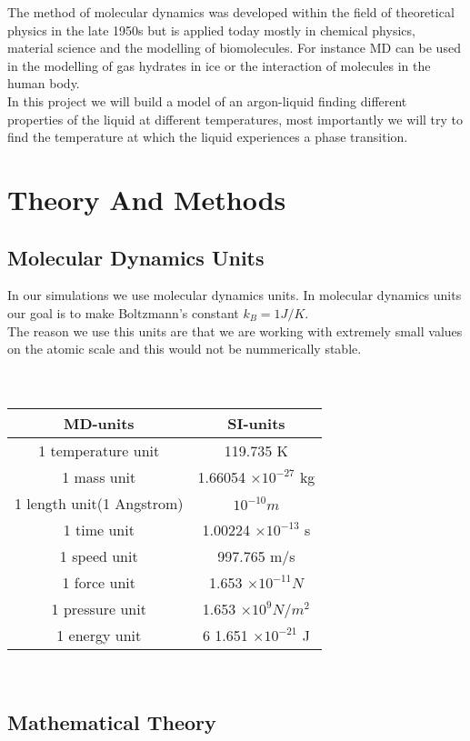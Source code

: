 \documentclass[a4paper, 12pt]{article}
\begin{document}
The method of molecular dynamics was developed within the field of theoretical physics in the late 1950s\cite{MD} but is applied today mostly in chemical physics, material science and the modelling of biomolecules. For instance MD can be used in the modelling of gas hydrates in ice or the interaction of molecules in the human body.\\

In this project we will build a model of an argon-liquid finding different properties of the liquid at different temperatures, most importantly we will try to find the temperature at which the liquid experiences a phase transition.

\newpage
\section{ Theory And Methods}
\subsection{Molecular Dynamics Units}
In our simulations we use molecular dynamics units. In molecular dynamics units our goal is to make Boltzmann's constant $k_B = 1 J/K$. \\The reason we use this units are that we are working with extremely small values on the atomic scale and this would not be nummerically stable.\\
\\ \\
\begin{tabular}{| c | c |}
\hline
\textbf{MD-units}  & \textbf{SI-units}\\
\hline
1 temperature unit & 119.735 K\\
\hline
1 mass unit & 1.66054 $\times 10^{-27}$ kg\\
\hline
1 length unit(1 Angstrom) & $10^{-10}\textit{m} $\\ \hline
1 time unit & 1.00224 $\times 10^{-13}$ s \\ \hline
1 speed unit & 997.765 m/s\\ \hline
1 force unit & 1.653 $\times 10^{-11} N$\\ \hline
1 pressure unit & 1.653 $\times 10^{9} N/\textit{m}^2$\\ \hline
1 energy unit & 6 1.651 $\times 10^{-21}$ J\\
\hline
\end{tabular}
\\


\subsection{Mathematical Theory}
\end{document}
